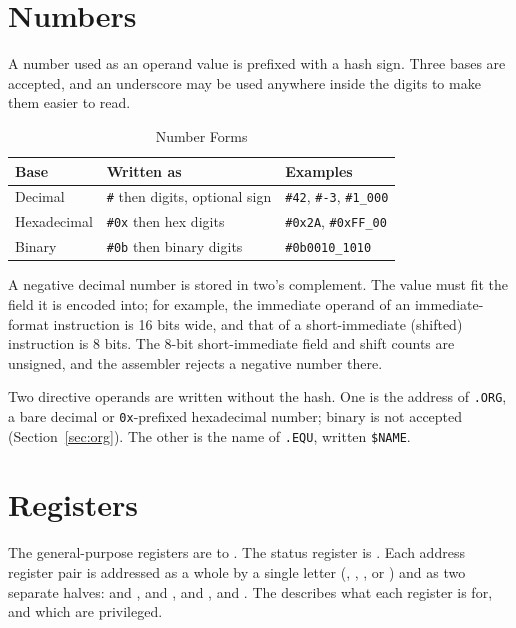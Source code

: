 \section{Numbers}
\label{sec:numbers}

A number used as an operand value is prefixed with a hash sign. Three bases are accepted, and an underscore may be used
anywhere inside the digits to make them easier to read.

\begin{table}[H]
	\centering
	\begin{tabular}{lll}
		\toprule
		\textbf{Base} & \textbf{Written as}                    & \textbf{Examples}                               \\
		\midrule
		Decimal       & \texttt{\#} then digits, optional sign & \texttt{\#42}, \texttt{\#-3}, \texttt{\#1\_000} \\
		Hexadecimal   & \texttt{\#0x} then hex digits          & \texttt{\#0x2A}, \texttt{\#0xFF\_00}            \\
		Binary        & \texttt{\#0b} then binary digits       & \texttt{\#0b0010\_1010}                         \\
		\bottomrule
	\end{tabular}
	\caption{Number Forms}
	\label{tab:number-forms}
\end{table}

A negative decimal number is stored in two's complement. The value must fit the field it is encoded into; for example,
the immediate operand of an immediate-format instruction is 16 bits wide, and that of a short-immediate (shifted)
instruction is 8 bits. The 8-bit short-immediate field and shift counts are unsigned, and the assembler rejects a
negative number there.

Two directive operands are written without the hash. One is the address of \texttt{.ORG}, a bare decimal or
\texttt{0x}-prefixed hexadecimal number; binary is not accepted (Section~\ref{sec:org}). The other is the name of
\texttt{.EQU}, written \texttt{\$NAME}.

\section{Registers}

The general-purpose registers are  to . The status register is . Each address register pair is
addressed as a whole by a single letter (, , , or ) and as two separate halves: 
and ,  and ,  and ,  and . The \archmanual{} describes what
each register is for, and which are privileged.

